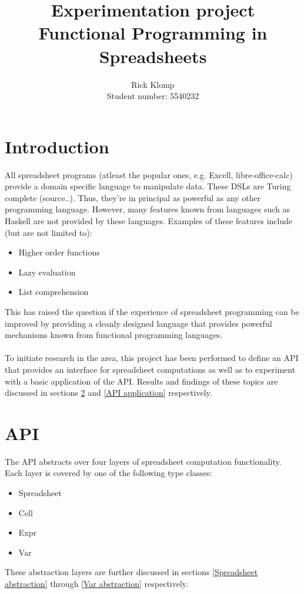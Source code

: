 \documentclass[10pt,a4paper]{article}
\begin{document}
\author{Rick Klomp\\Student number: 5540232}
\title{Experimentation project\\Functional Programming in Spreadsheets}
\maketitle
\pagebreak

\section{Introduction}
All spreadsheet programs (atleast the popular ones, e.g. Excell, libre-office-calc) provide a
domain specific language to manipulate data. These DSLs are Turing complete (source..). Thus,
they're in principal as powerful as any other programming language.
However, many features known from languages such as Haskell are not provided by these languages.
Examples of these features include (but are not limited to):
\begin{itemize}
\item Higher order functions
\item Lazy evaluation
\item List comprehension
\end{itemize}
This has raised the question if the experience of spreadsheet programming can be improved by
providing a cleanly designed language that provides powerful mechanisms known from functional
programming languages.
\\\\
To initiate research in the area, this project has been performed to define an API that provides
an interface for spreadsheet computations as well as to experiment with a basic application of
the API. Results and findings of these topics are discussed in sections \ref{API} and
\ref{API application} respectively.

\section{API}
\label{API}
The API abstracts over four layers of spreadsheet computation functionality.
Each layer is covered by one of the following type classes:
\begin{itemize}
\item Spreadsheet
\item Cell
\item Expr
\item Var
\end{itemize}
These abstraction layers are further discussed in sections \ref{Spreadsheet abstraction} through
\ref{Var abstraction} respectively.
\end{document}
